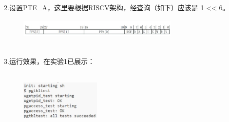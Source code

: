 \documentclass[12pt]{article}
\begin{document}
2.设置PTE\_A，这里要根据RISCV架构，经查询（如下）应该是 1 << 6。\\
\begin{figure}[h]
	\centering
	\includegraphics[height=1cm,width=8cm]{lab3-10.jpg}
\end{figure}\\
3.运行效果，在实验1已展示：
\begin{figure}[H]
	\centering
	\includegraphics[height=3cm,width=4cm]{lab3-6.jpg}
\end{figure}
\end{document}
